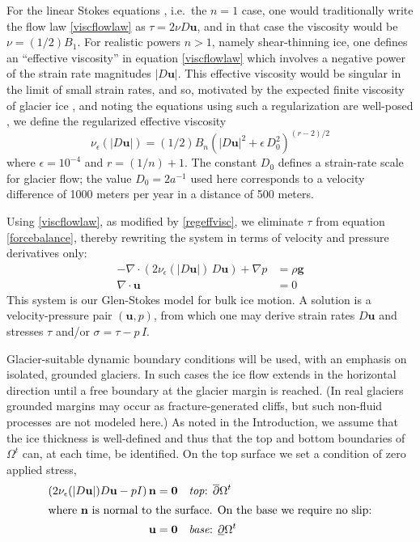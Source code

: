 \documentclass[letterpaper,final,12pt,reqno]{amsart}
\newcommand{\eps}{\epsilon}
\newcommand{\Div}{\nabla\cdot}
\newcommand{\bn}{\mathbf{n}}
\newcommand{\bu}{\mathbf{u}}
\newcommand{\bzero}{\bm{0}}
\begin{document}
For the linear Stokes equations \cite{Elmanetal2014}, i.e.~the $n=1$ case, one would traditionally write the flow law \eqref{viscflowlaw} as $\tau = 2\nu D\bu$, and in that case the viscosity would be $\nu = (1/2) B_1$.  For realistic powers $n>1$, namely shear-thinning ice, one defines an ``effective viscosity'' in equation \eqref{viscflowlaw} which involves a negative power of the strain rate magnitudes $|D\bu|$.  This effective viscosity would be singular in the limit of small strain rates, and so, motivated by the expected finite viscosity of glacier ice \cite{GreveBlatter2009}, and noting the equations using such a regularization are well-posed \cite{JouvetRappaz2011}, we define the regularized effective viscosity
\begin{equation}
\nu_\eps(|D\bu|) = (1/2) B_n \left(|D\bu|^2 + \eps\, D_0^2\right)^{(r-2)/2} \label{regeffvisc}
\end{equation}
where $\eps = 10^{-4}$ and $r=(1/n)+1$.  The constant $D_0$ defines a strain-rate scale for glacier flow; the value $D_0 = 2 a^{-1}$ used here corresponds to a velocity difference of 1000 meters per year in a distance of 500 meters.

Using \eqref{viscflowlaw}, as modified by \eqref{regeffvisc}, we eliminate $\tau$ from equation \eqref{forcebalance}, thereby rewriting the system in terms of velocity and pressure derivatives only:
\begin{align}
- \nabla \cdot \left(2 \nu_\eps(|D\bu|)\, D\bu\right) + \nabla p &= \rho \mathbf{g} \label{stokes} \\
\Div \bu &= 0 \label{incompagain}
\end{align}
This system is our Glen-Stokes model for bulk ice motion.  A solution is a velocity-pressure pair $(\bu,p)$, from which one may derive strain rates $D\bu$ and stresses $\tau$ and/or $\sigma = \tau - p\,I$.

Glacier-suitable dynamic boundary conditions will be used, with an emphasis on isolated, grounded glaciers.  In such cases the ice flow extends in the horizontal direction until a free boundary at the glacier margin is reached.  (In real glaciers grounded margins may occur as fracture-generated cliffs, but such non-fluid processes are not modeled here.)  As noted in the Introduction, we assume that the ice thickness is well-defined and thus that the top and bottom boundaries of $\Omega^t$ can, at each time, be identified.  On the top surface we set a condition of zero applied stress,
\begin{align}
\left(2 \nu_\eps(|D\bu|) D\bu - pI\right) \bn &= \bzero  &&\text{\emph{top}: } \overline{\partial} \Omega^t \label{topbc} \\
\intertext{where $\bn$ is normal to the surface.  On the base we require no slip:}
\bu &= \bzero  &&\text{\emph{base}: } \underline{\partial} \Omega^t \label{basebc}
\end{align}
\end{document}
